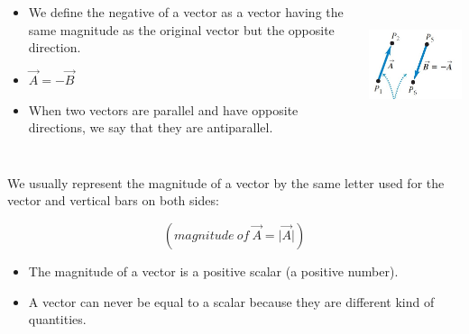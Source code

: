 \documentclass[]{beamer}
\begin{document}
     \begin{frame}




      \begin{columns}[c]
      \column{2in}  %
     
   \begin{itemize}
   \item We define the negative of a vector as a vector having the
   same magnitude as the original vector but the opposite direction.
   
   \item $\vec{A}=-\vec{B}$
   
   \item When two vectors are parallel and have opposite directions,
   we say that they are antiparallel.
   \end{itemize}
   
   
      \column{2in}
   
   
   
     \begin{center}
     \includegraphics[height=1.7in]{images/antiparalel_vec.jpg}
   \end{center}
   
   
      \end{columns}
   
   
   
   
   \end{frame}



\begin{frame}

  We usually represent the magnitude of a vector  by the same letter used for the vector
  and vertical bars on both sides:
  \pause
  
  \begin{equation}
  (magnitude~of~\vec{A}=\lvert \vec{A} \rvert)
  \end{equation}
  
  \pause 
  \begin{itemize}
  \item The magnitude of a vector is a positive scalar (a positive number). 
  \pause
  \item A vector can never be equal to a scalar because they are different kind of quantities.
  \end{itemize}
  
  \end{frame}
  
\end{document}
